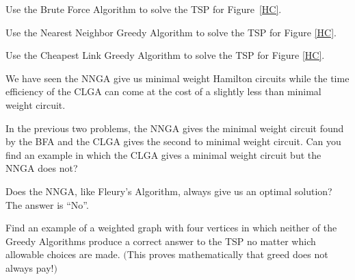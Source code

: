 \begin{prb}\label{BF4HC}
Use the Brute Force Algorithm to solve the TSP for Figure~\ref{HC}.
\end{prb}

\begin{prb}
Use the Nearest Neighbor Greedy Algorithm to solve the TSP for Figure \ref{HC}.
\end{prb}

\begin{prb}
Use the Cheapest Link Greedy Algorithm to solve the TSP for Figure \ref{HC}.
\end{prb}

We have seen the NNGA give us minimal weight Hamilton circuits while the time efficiency of the CLGA can come at the cost of a slightly less than minimal weight circuit.

\begin{prb}
In the previous two problems, the NNGA gives the minimal weight circuit found by the BFA and the CLGA gives the second to minimal weight circuit.  Can you find an example in which the CLGA gives a minimal weight circuit but the NNGA does not?
\begin{annotation}
\end{annotation}
\end{prb}

Does the NNGA, like Fleury's Algorithm, always give us an optimal solution?  The answer is ``No''.

\begin{prb}\label{GAs fail}
Find an example of a weighted graph with four vertices in which neither of the Greedy Algorithms produce a correct answer to the TSP no matter which allowable choices are made. $($This proves mathematically that greed does not always pay!$)$
\msk
\end{prb}


